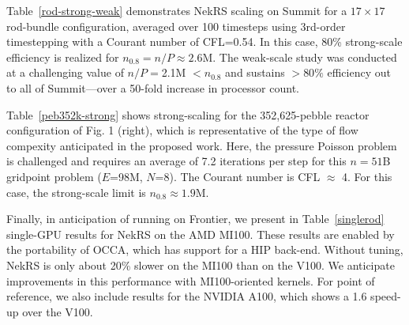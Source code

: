 
Table~\ref{rod-strong-weak} demonstrates NekRS scaling on Summit for a
$17 \times 17$ rod-bundle configuration, averaged over 100 timesteps
using 3rd-order timestepping with a Courant number of CFL=0.54.
In this case, 80\% strong-scale efficiency is realized for 
$n_{0.8} = n/P \approx 2.6$M.  The weak-scale study was conducted at a 
challenging value of $n/P = $2.1M $< n_{0.8}$ and sustains $> 80\%$
efficiency out to all of Summit---over a 50-fold increase in processor count.

Table~\ref{peb352k-strong} shows strong-scaling for the 352,625-pebble reactor
configuration of Fig. 1 (right), which is representative of the type of flow
compexity anticipated in the proposed work.  Here, the pressure Poisson 
problem is challenged and requires an average of 7.2 iterations per step
for this $n=51$B gridpoint problem ($E$=98M, $N$=8).  The Courant number
is CFL $\approx$ 4.  For this case, the strong-scale limit is $n_{0.8}\approx 1.9$M.

Finally, in anticipation of running on Frontier, we present in
Table~\ref{singlerod} single-GPU results for NekRS on the AMD MI100.  These
results are enabled by the portability of OCCA, which has support for a HIP
back-end.  Without tuning, NekRS is only about 20\% slower on the MI100 than on
the V100.   We anticipate improvements in this performance with MI100-oriented
kernels.
For point of reference, we also include results for the NVIDIA
A100, which shows a 1.6 speed-up over the V100.


